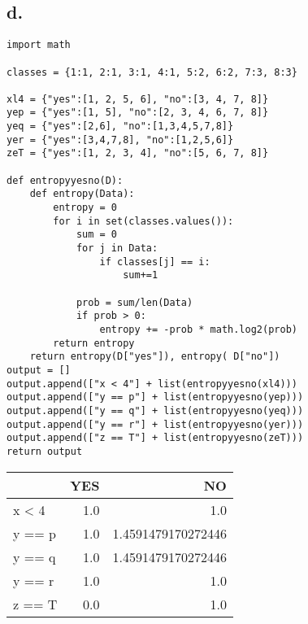 \documentclass[11pt]{article}
\begin{document}
\subsection*{d.}
\label{sec:org2b84ed1}
\begin{verbatim}
import math

classes = {1:1, 2:1, 3:1, 4:1, 5:2, 6:2, 7:3, 8:3}

xl4 = {"yes":[1, 2, 5, 6], "no":[3, 4, 7, 8]}
yep = {"yes":[1, 5], "no":[2, 3, 4, 6, 7, 8]}
yeq = {"yes":[2,6], "no":[1,3,4,5,7,8]}
yer = {"yes":[3,4,7,8], "no":[1,2,5,6]}
zeT = {"yes":[1, 2, 3, 4], "no":[5, 6, 7, 8]}

def entropyyesno(D):
    def entropy(Data):
        entropy = 0
        for i in set(classes.values()):
            sum = 0
            for j in Data:
                if classes[j] == i:
                    sum+=1

            prob = sum/len(Data)
            if prob > 0:
                entropy += -prob * math.log2(prob)
        return entropy
    return entropy(D["yes"]), entropy( D["no"])
output = []
output.append(["x < 4"] + list(entropyyesno(xl4)))
output.append(["y == p"] + list(entropyyesno(yep)))
output.append(["y == q"] + list(entropyyesno(yeq)))
output.append(["y == r"] + list(entropyyesno(yer)))
output.append(["z == T"] + list(entropyyesno(zeT)))
return output
\end{verbatim}

\begin{center}
\begin{tabular}{lrr}
 & YES & NO\\
\hline
x < 4 & 1.0 & 1.0\\
y == p & 1.0 & 1.4591479170272446\\
y == q & 1.0 & 1.4591479170272446\\
y == r & 1.0 & 1.0\\
z == T & 0.0 & 1.0\\
\end{tabular}
\end{center}
\end{document}
